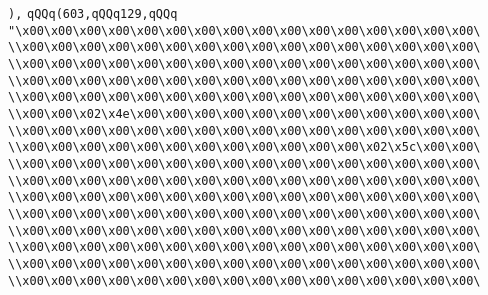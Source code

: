 \verb|),|\newline
\verb|qQQq(603,qQQq129,qQQq|\newline
\verb|"\x00\x00\x00\x00\x00\x00\x00\x00\x00\x00\x00\x00\x00\x00\x00\x00\|\newline
\verb|\\x00\x00\x00\x00\x00\x00\x00\x00\x00\x00\x00\x00\x00\x00\x00\x00\|\newline
\verb|\\x00\x00\x00\x00\x00\x00\x00\x00\x00\x00\x00\x00\x00\x00\x00\x00\|\newline
\verb|\\x00\x00\x00\x00\x00\x00\x00\x00\x00\x00\x00\x00\x00\x00\x00\x00\|\newline
\verb|\\x00\x00\x00\x00\x00\x00\x00\x00\x00\x00\x00\x00\x00\x00\x00\x00\|\newline
\verb|\\x00\x00\x02\x4e\x00\x00\x00\x00\x00\x00\x00\x00\x00\x00\x00\x00\|\newline
\verb|\\x00\x00\x00\x00\x00\x00\x00\x00\x00\x00\x00\x00\x00\x00\x00\x00\|\newline
\verb|\\x00\x00\x00\x00\x00\x00\x00\x00\x00\x00\x00\x00\x02\x5c\x00\x00\|\newline
\verb|\\x00\x00\x00\x00\x00\x00\x00\x00\x00\x00\x00\x00\x00\x00\x00\x00\|\newline
\verb|\\x00\x00\x00\x00\x00\x00\x00\x00\x00\x00\x00\x00\x00\x00\x00\x00\|\newline
\verb|\\x00\x00\x00\x00\x00\x00\x00\x00\x00\x00\x00\x00\x00\x00\x00\x00\|\newline
\verb|\\x00\x00\x00\x00\x00\x00\x00\x00\x00\x00\x00\x00\x00\x00\x00\x00\|\newline
\verb|\\x00\x00\x00\x00\x00\x00\x00\x00\x00\x00\x00\x00\x00\x00\x00\x00\|\newline
\verb|\\x00\x00\x00\x00\x00\x00\x00\x00\x00\x00\x00\x00\x00\x00\x00\x00\|\newline
\verb|\\x00\x00\x00\x00\x00\x00\x00\x00\x00\x00\x00\x00\x00\x00\x00\x00\|\newline
\verb|\\x00\x00\x00\x00\x00\x00\x00\x00\x00\x00\x00\x00\x00\x00\x00\x00\|\newline
